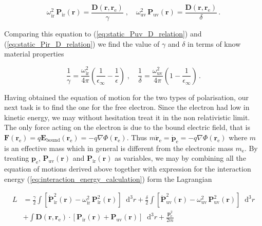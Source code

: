 \documentclass[12pt]{report}
\renewcommand{\vec}[1]{\boldsymbol{\mathbf{#1}}}                        %
\newcommand*\diff{\mathop{}\!\mathrm{d}}
\begin{document}
\begin{equation}
	\omega^2_\text{ir} \, \vec P_\text{ir} (\vec r) = \frac{ \vec D(\vec r, \vec r_\text{e})}{ \gamma }
	\; , \quad
	\omega^2_\text{uv} \, \vec P_\text{uv} (\vec r) = \frac{ \vec D(\vec r, \vec r_\text{e})}{ \delta } \,.
\end{equation}

Comparing this equation to (\ref{eq:static_Puv_D_relation}) and (\ref{eq:static_Pir_D_relation}) we find the value of $ \gamma $ and $ \delta $ in terms of know material properties

\begin{equation}
	\frac{1}{\gamma} = \frac{\omega_\text{ir}^2}{4 \pi} \left( \frac{1}{\epsilon_\infty} - \frac{1}{\epsilon} \right)
	\; , \quad
	\frac{1}{\delta} = \frac{\omega_\text{uv}^2}{4 \pi} \left( 1 - \frac{1}{\epsilon_\infty} \right) \,.
\end{equation}

Having obtained the equation of motion for the two types of polarisation, our next task is to find the one for the free electron. Since the electron had low in kinetic energy, we may without hesitation treat it in the non relativistic limit. The only force acting on the electron is due to the bound electric field, that is $ \vec F(\vec r_\text{e}) = q \vec E_\text{bound} (\vec r_\text{e}) = - q \nabla \Phi (\vec r_\text{e}) $. Thus $ m \ddot{\vec r}_\text{e} = \dot{\vec p}_\text{e} = - q \nabla \Phi (\vec r_\text{e}) $ where $ m $ is an effective mass which in general is different from the electronic mass $ m_\text{e} $. By treating $ \vec p_\text{e} $,  $ \vec P_\text{uv} (\vec r) $ and $ \vec P_\text{ir} (\vec r) $ as variables, we may by combining all the equation of motions derived above together with expression for the interaction energy (\ref{eq:interaction_energy_calculation}) form the Lagrangian

\begin{equation}
	\begin{split}
		L &= \frac{\gamma}{2} \int \left[ \dot{\vec P}_\text{ir}^2 (\vec r) - \omega_\text{ir}^2 \, \vec P_\text{ir}^2 (\vec r) \right] \diff^3 r
		+ \frac{\delta}{2} \int \left[ \dot{\vec P}_\text{uv}^2 (\vec r) - \omega_\text{uv}^2 \, \vec P_\text{uv}^2 (\vec r) \right] \diff^3 r \\
		&+ \int \vec D(\vec r, \vec r_\text{e}) \cdot \left[ \vec P_\text{ir}(\vec r) +  \vec P_\text{uv}(\vec r) \right] \diff^3 r
		+ \frac{\vec p_\text{e}^2}{2m}
	\end{split}
\end{equation}
\end{document}
